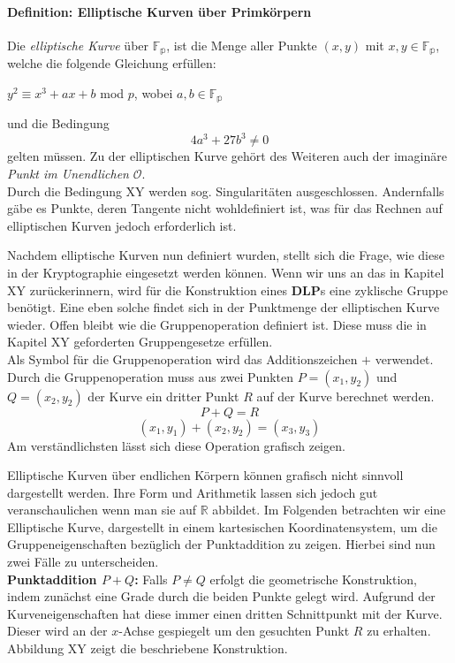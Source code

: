 \paragraph{Definition: Elliptische Kurven über Primkörpern}
Die \textit{elliptische Kurve} über $\mathbb{F_p}$, ist die Menge aller Punkte $(x,y)$ mit $x,y \in \mathbb{F_p}$, welche die folgende Gleichung erfüllen: 
\begin{center}
$y^2 \equiv x^3 + ax + b$ mod $p$, wobei $a,b \in \mathbb{F_p}$
\end{center} 
und die Bedingung  $$4a^3 + 27b^3 \neq 0$$ gelten müssen. Zu der elliptischen Kurve gehört des Weiteren auch der imaginäre \textit{Punkt im Unendlichen} $\mathcal{O}$.\\

Durch die Bedingung XY werden sog. Singularitäten ausgeschlossen. Andernfalls gäbe es Punkte, deren Tangente nicht wohldefiniert ist, was für das Rechnen auf elliptischen Kurven jedoch erforderlich ist.

Nachdem elliptische Kurven nun definiert wurden, stellt sich die Frage, wie diese in der Kryptographie eingesetzt werden können. Wenn wir uns an das in Kapitel XY zurückerinnern, wird für die Konstruktion eines \textbf{DLP}s eine zyklische Gruppe benötigt. Eine eben solche findet sich in der Punktmenge der elliptischen Kurve wieder. Offen bleibt wie die Gruppenoperation definiert ist. Diese muss die in Kapitel XY geforderten Gruppengesetze erfüllen.\\

Als Symbol für die Gruppenoperation wird das Additionszeichen $+$ verwendet. Durch die Gruppenoperation muss aus zwei Punkten $P = (x_1, y_2)$ und $Q= (x_2, y_2)$ der Kurve ein dritter Punkt $R$ auf der Kurve berechnet werden. 
$$P + Q = R$$ $$(x_1, y_1) +  (x_2, y_2) = (x_3, y_3)$$
Am verständlichsten lässt sich diese Operation grafisch zeigen.

Elliptische Kurven über endlichen Körpern können grafisch nicht sinnvoll dargestellt werden. Ihre Form und Arithmetik lassen sich jedoch gut veranschaulichen wenn man sie auf $\mathbb{R}$ abbildet. Im Folgenden betrachten wir eine Elliptische Kurve, dargestellt in einem kartesischen Koordinatensystem, um die Gruppeneigenschaften bezüglich der Punktaddition zu zeigen. Hierbei sind nun zwei Fälle zu unterscheiden.\\

\textbf{Punktaddition $P + Q$:}
Falls $P \neq Q$ erfolgt die geometrische Konstruktion, indem zunächst eine Grade durch die beiden Punkte gelegt wird. Aufgrund der Kurveneigenschaften hat diese immer einen dritten Schnittpunkt mit der Kurve. Dieser wird an der $x$-Achse gespiegelt um den gesuchten Punkt $R$ zu erhalten. Abbildung XY zeigt die beschriebene Konstruktion.

